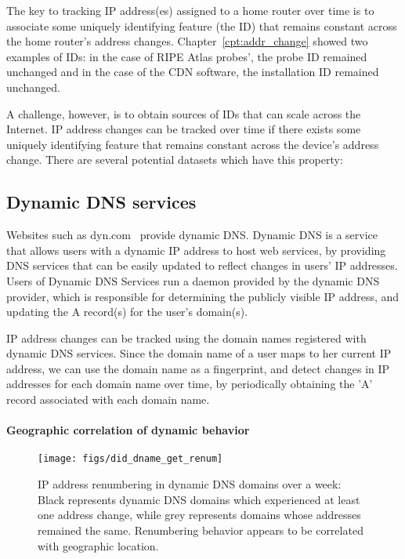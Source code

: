 The key to tracking IP address(es) assigned to a home router over time
is to associate some uniquely identifying feature (the ID) that remains
constant across the home router's address
changes. Chapter~\ref{cpt:addr_change} showed two examples of IDs: in the
case of RIPE Atlas probes', the probe ID remained unchanged and in the
case of the CDN software, the installation ID remained unchanged.%

A challenge, however, is to obtain sources of IDs that can scale
across the Internet. IP address changes can
be tracked over time if there exists some uniquely identifying feature
that remains constant across the device's address change. There are several potential datasets which have this
property:

\subsection{Dynamic DNS services}

Websites such as dyn.com~\cite{dyn} provide dynamic DNS. Dynamic
DNS is a service that allows users with a dynamic IP address to host
web services, by providing DNS services that can be easily updated to
reflect changes in users' IP addresses. Users of Dynamic DNS Services
run a daemon provided by the dynamic DNS provider, which is responsible for
determining the publicly visible IP address, and updating the A
record(s) for the user's domain(s). 

IP address changes can be tracked using the domain names
registered with dynamic DNS services. Since the domain name of a user
maps to her current IP address, we can use the domain name as a
fingerprint, and detect changes in IP addresses for each domain name
over time, by periodically obtaining the 'A' record associated with
each domain name. 

\paragraph{Geographic correlation of dynamic behavior}

\begin{figure}[tb]
\begin{center}
\texttt{[image: figs/did\_dname\_get\_renum]}
\end{center}
\caption{\label{fig:addr_change_per_ctry}
IP address renumbering in dynamic DNS domains over a week: Black
represents dynamic DNS domains which experienced at least one address
change, while grey represents domains whose addresses remained the
same. Renumbering behavior appears to be correlated with geographic
location.}
\end{figure}

